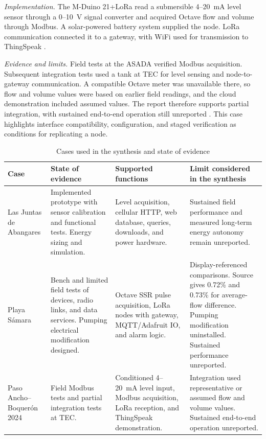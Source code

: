\documentclass[conference]{IEEEtran}
\begin{document}
\textit{Implementation.} The M-Duino 21+LoRa read a submersible 4--20~mA level sensor through a 0--10~V signal converter and acquired Octave flow and volume through Modbus. A solar-powered battery system supplied the node. LoRa communication connected it to a gateway, with WiFi used for transmission to ThingSpeak \cite[Chs.~5--7 and Annex~9.4]{oviedo2024desarrollo}.

\textit{Evidence and limits.} Field tests at the ASADA verified Modbus acquisition. Subsequent integration tests used a tank at TEC for level sensing and node-to-gateway communication. A compatible Octave meter was unavailable there, so flow and volume values were based on earlier field readings, and the cloud demonstration included assumed values. The report therefore supports partial integration, with sustained end-to-end operation still unreported \cite[Sec.~6.2 and Annexes~9.2--9.3]{oviedo2024desarrollo}. This case highlights interface compatibility, configuration, and staged verification as conditions for replicating a node.

\begin{table}[t]
\caption{Cases used in the synthesis and state of evidence}
\label{tab:cases}
\centering
\scriptsize
\renewcommand{\arraystretch}{1.05}
\begin{tabularx}{\textwidth}{|>{\raggedright\arraybackslash}p{}|>{\raggedright\arraybackslash}p{}|>{\raggedright\arraybackslash}X|>{\raggedright\arraybackslash}X|}
\hline
\textbf{Case} & \textbf{State of evidence} & \textbf{Supported functions} & \textbf{Limit considered in the synthesis} \\
\hline
Las Juntas de Abangares \cite{chavarria2021implementacion} & Implemented prototype with sensor calibration and functional tests. Energy sizing and simulation. & Level acquisition, cellular HTTP, web database, queries, downloads, and power hardware. & Sustained field performance and measured long-term energy autonomy remain unreported. \\
\hline
Playa Sámara \cite{solorzano2021sistema} & Bench and limited field tests of devices, radio links, and data services. Pumping electrical modification designed. & Octave SSR pulse acquisition, LoRa nodes with gateway, MQTT/Adafruit IO, and alarm logic. & Display-referenced comparisons. Source gives 0.72\% and 0.73\% for average-flow difference. Pumping modification uninstalled. Sustained performance unreported. \\
\hline
Paso Ancho--Boquerón 2024 \cite{oviedo2024desarrollo} & Field Modbus tests and partial integration tests at TEC. & Conditioned 4--20~mA level input, Modbus acquisition, LoRa reception, and ThingSpeak demonstration. & Integration used representative or assumed flow and volume values. Sustained end-to-end operation unreported. \\
\hline
\end{tabularx}
\end{table}
\end{document}
